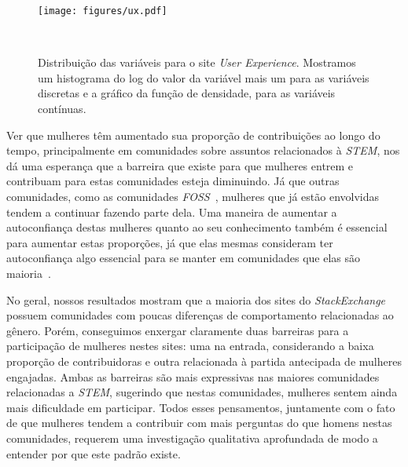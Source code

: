 \begin{figure}
  \centering
  \texttt{[image: figures/ux.pdf]}
  \caption[Distribuição das variáveis para o site \emph{User Experience}]{Distribuição das variáveis para o site \emph{User Experience}. Mostramos um histograma do log do valor da variável mais um para as variáveis discretas e a gráfico da função de densidade, para as variáveis contínuas. }~\label{fig:ux}
\end{figure}

Ver que mulheres têm aumentado sua proporção de contribuições ao longo do tempo, principalmente em comunidades sobre assuntos relacionados à \emph{STEM}, nos dá uma esperança que a barreira que existe para que mulheres entrem e contribuam para estas comunidades esteja diminuindo. Já que outras comunidades, como as comunidades \emph{FOSS}~\cite{powell2010gender}, mulheres que já estão envolvidas tendem a continuar fazendo parte dela. Uma maneira de aumentar a autoconfiança destas mulheres quanto ao seu conhecimento também é essencial para aumentar estas proporções, já que elas mesmas consideram ter autoconfiança algo essencial para se manter em comunidades que elas são maioria~\cite{powell2010gender}.

No geral, nossos resultados mostram que a maioria dos sites do \emph{StackExchange} possuem comunidades com poucas diferenças de comportamento relacionadas ao gênero. Porém, conseguimos enxergar claramente duas barreiras para a participação de mulheres nestes sites: uma na entrada, considerando a baixa proporção de contribuidoras e outra relacionada à partida antecipada de mulheres engajadas. Ambas as barreiras são mais expressivas nas maiores comunidades relacionadas a \emph{STEM}, sugerindo que nestas comunidades, mulheres sentem ainda mais dificuldade em participar. Todos esses pensamentos, juntamente com o fato de que mulheres tendem a contribuir com mais perguntas do que homens nestas comunidades, requerem uma investigação qualitativa aprofundada de modo a entender por que este padrão existe.



